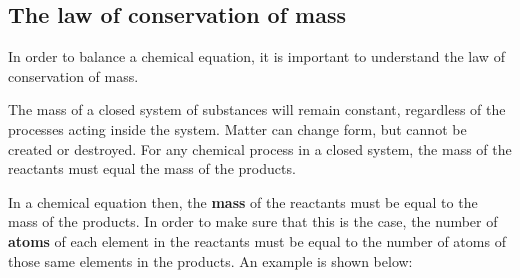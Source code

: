             \subsection*{The law of conservation of mass}
            \nopagebreak
        \label{m38726*id63198}In order to balance a chemical equation, it is important to understand the law of conservation of mass.\par 
\label{m38726*fhsst!!!underscore!!!id145}
 { \label{m38726*meaningfhsst!!!underscore!!!id145}
        \label{m38726*id63208}The mass of a closed system of substances will remain constant, regardless of the processes acting inside the system. Matter can change form, but cannot be created or destroyed. For any chemical process in a closed system, the mass of the reactants must equal the mass of the products. \par 
         } 
        \label{m38726*id63221}In a chemical equation then, the \textbf{mass} of the reactants must be equal to the mass of the products. In order to make sure that this is the case, the number of \textbf{atoms} of each element in the reactants must be equal to the number of atoms of those same elements in the products. An example is shown below:\par 
